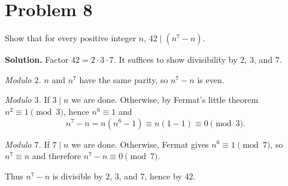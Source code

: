 \section*{Problem 8}

Show that for every positive integer $n$, $42\mid (n^{7}-n)$.

\textbf{Solution.}
Factor $42=2\cdot 3\cdot 7$. It suffices to show divisibility by $2$, $3$, and $7$.

\emph{Modulo $2$.} $n$ and $n^{7}$ have the same parity, so $n^{7}-n$ is even.

\emph{Modulo $3$.} If $3\mid n$ we are done. Otherwise, by Fermat’s little theorem
$n^{2}\equiv 1 \pmod{3}$, hence $n^{6}\equiv 1$ and
\[
n^{7}-n = n(n^{6}-1) \equiv n(1-1) \equiv 0 \pmod{3}.
\]

\emph{Modulo $7$.} If $7\mid n$ we are done. Otherwise, Fermat gives $n^{6}\equiv 1 \pmod{7}$,
so $n^{7}\equiv n$ and therefore $n^{7}-n\equiv 0 \pmod{7}$.

Thus $n^{7}-n$ is divisible by $2$, $3$, and $7$, hence by $42$.
